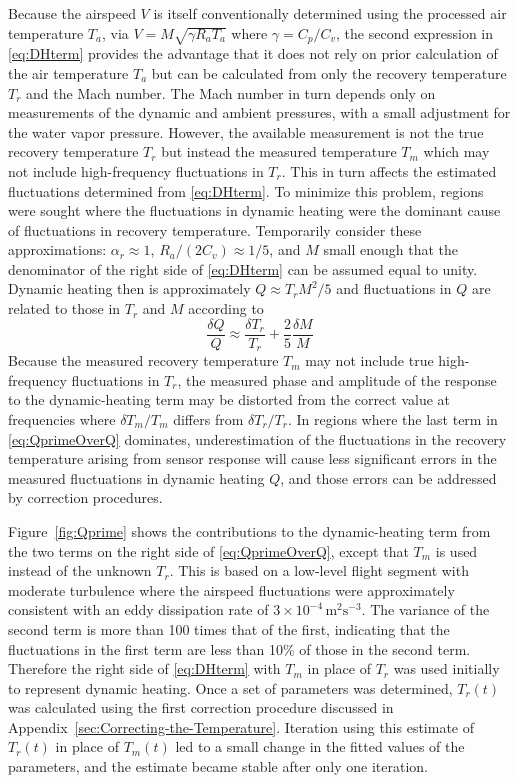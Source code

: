 \documentclass[11pt,twoside,american,12pt,twoside,american]{article}\usepackage[]{graphicx}\usepackage[]{color}
\begin{document}
Because the airspeed $V$ is itself conventionally determined using
the processed air temperature $T_{a}$, via $V=M\sqrt{\gamma R_{a}T_{a}}$
where $\gamma=C_{p}/C_{v}$, the second expression in \eqref{eq:DHterm}
provides the advantage that it does not rely on prior calculation
of the air temperature $T_{a}$ but can be calculated from only the
recovery temperature $T_{r}$ and the Mach number. The Mach number
in turn depends only on measurements of the dynamic and ambient pressures,
with a small adjustment for the water vapor pressure. However, the
available measurement is not the true recovery temperature $T_{r}$
but instead the measured temperature $T_{m}$ which may not include
high-frequency fluctuations in $T_{r}$. This in turn affects the
estimated fluctuations determined from \eqref{eq:DHterm}. To minimize
this problem, regions were sought where the fluctuations in dynamic
heating were the dominant cause of fluctuations in recovery temperature.
Temporarily consider these approximations: $\alpha_{r}\approx1$,
$R_{a}/(2C_{v})\approx1/5$, and $M$ small enough that the denominator
of the right side of \eqref{eq:DHterm} can be assumed equal to unity.
Dynamic heating then is approximately $Q\approx T_{r}M^{2}/5$ and
fluctuations in $Q$ are related to those in $T_{r}$ and $M$ according
to\\
\begin{equation}
\frac{\delta Q}{Q}\approx\frac{\delta T_{r}}{T_{r}}+\frac{2}{5}\frac{\delta M}{M}\label{eq:QprimeOverQ}
\end{equation}
Because the measured recovery temperature $T_{m}$ may not include
true high-frequency fluctuations in $T_{r}$, the measured phase and
amplitude of the response to the dynamic-heating term may be distorted
from the correct value at frequencies where $\delta T_{m}/T_{m}$
differs from $\delta T_{r}/T_{r}$. In regions where the last term
in \eqref{eq:QprimeOverQ} dominates, underestimation of the fluctuations
in the recovery temperature arising from sensor response will cause
less significant errors in the measured fluctuations in dynamic heating
$Q$, and those errors can be addressed by correction procedures.

Figure~\ref{fig:Qprime} shows the contributions to the dynamic-heating
term from the two terms on the right side of \eqref{eq:QprimeOverQ},
except that $T_{m}$ is used instead of the unknown $T_{r}$. This
is based on a low-level flight segment with moderate turbulence where
the airspeed fluctuations were approximately consistent with an eddy
dissipation rate of $3\times10^{-4}\,\mathrm{m}^{2}\mathrm{s}^{-3}$.
The variance of the second term is more than 100 times that of the
first, indicating that the fluctuations in the first term are less
than 10\% of those in the second term. Therefore the right side of
\eqref{eq:DHterm} with $T_{m}$ in place of $T_{r}$ was used initially
to represent dynamic heating. Once a set of parameters was determined,
$T_{r}(t)$ was calculated using the first correction procedure discussed
in Appendix~\ref{sec:Correcting-the-Temperature}. Iteration using
this estimate of $T_{r}(t)$ in place of $T_{m}(t)$ led to a small
change in the fitted values of the parameters, and the estimate became
stable after only one iteration.
\end{document}
